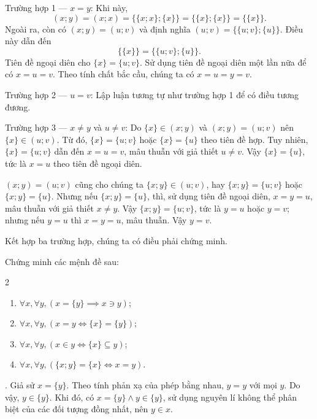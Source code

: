 \textcolor{colorEmphasisCyan}{Trường hợp 1 --- $x = y$}: Khi này, $$(x; y) = (x; x) = \{\{x; x\}; \{x\}\} = \{\{x\}; \{x\}\} = \{\{x\}\}.$$
Ngoài ra, còn có $(x; y) = (u; v)$ và định nghĩa $(u; v) = \{\{u; v\}; \{u\}\}$. Điều này dẫn đến 
$$
\{\{x\}\} = \{\{u; v\}; \{u\}\}.
$$
Tiên đề ngoại diên cho $\{x\} = \{u; v\}$. Sử dụng tiên đề ngoại diên một lần nữa để có $x = u = v$. Theo tính chất bắc cầu, chúng ta có $x = u = y = v$.

\textcolor{colorEmphasis}{Trường hợp 2 --- $u = v$}: Lập luận tương tự như trường hợp 1 để có điều tương đương.

\textcolor{colorEmphasisGreen}{Trường hợp 3 --- $x \neq y$ và $u \neq v$}: Do $\{x\} \in (x; y)$ và $(x; y) = (u; v)$ nên $\{x\} \in (u; v)$. Từ đó, $\{x\} = \{u; v\}$ hoặc $\{x\} = \{u\}$ theo tiên đề hợp. Tuy nhiên, $\{x\} = \{u; v\}$ dẫn đến $x = u = v$, mâu thuẫn với giả thiết $u \neq v$. Vậy $\{x\} = \{u\}$, tức là $x = u$ theo tiên đề ngoại diên.

$(x; y) = (u; v)$ cũng cho chúng ta $\{x; y\} \in (u; v)$, hay $\{x; y\} = \{u; v\}$ hoặc $\{x; y\} = \{u\}$. Nhưng nếu $\{x; y\} = \{u\}$, thì, sử dụng tiên đề ngoại diên, $x = y = u$, mâu thuẫn với giả thiết $x \neq y$. Vậy $\{x; y\} = \{u; v\}$, tức là $y = u$ hoặc $y = v$; nhưng nếu $y = u$ thì $x = y = u$, mâu thuẫn. Vậy $y = v$. 

Kết hợp ba trường hợp, chúng ta có điều phải chứng minh.

\exercise Chứng minh các mệnh đề sau:
\begin{multicols}{2}
   \begin{enumerate}
      \item $\forall x, \forall y, \left(x = \{y\} \implies x \ni y\right)$;
      \item $\forall x, \forall y, \left(x = y \iff \{x\} = \{y\}\right)$;
      \item $\forall x, \forall y, \left(x \in y \iff \{x\} \subseteq y\right)$;
      \item $\forall x, \forall y, \left(\{x; y\} = \{x\} \iff x = y \right)$.
   \end{enumerate}
\end{multicols}

\solution

\setcounter{subexercise}{1}
. Giả sử $x = \{y\}$. Theo tính phản xạ của phép bằng nhau, $y = y$ với mọi $y$. Do vậy, $y \in \{y\}$. Khi đó, có $x = \{y\} \land y \in \{y\}$, sử dụng nguyên lí không thể phân biệt của các đối tượng đồng nhất, nên $y \in x$.

